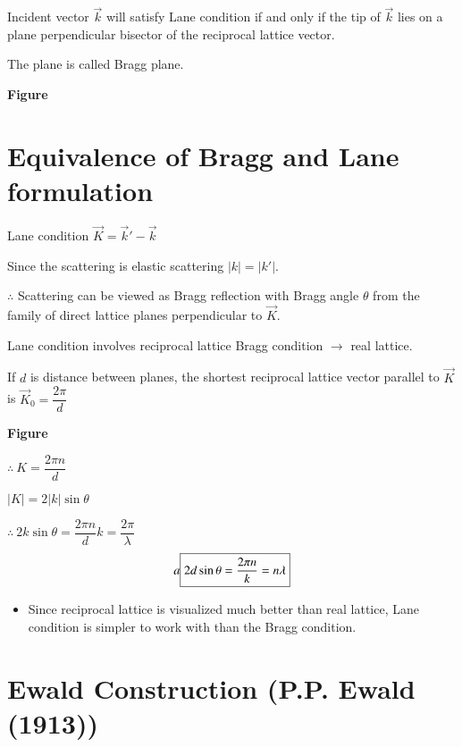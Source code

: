 Incident vector $\overrightarrow{k}$ will satisfy Lane condition if and only if the tip of $\overrightarrow{k}$ lies on a plane perpendicular bisector of the reciprocal lattice vector.

The plane is called Bragg plane.
\begin{center}
{\bf Figure}
\end{center}

\section*{Equivalence of Bragg and Lane formulation}

Lane condition $\overrightarrow{K}=\overrightarrow{k}'-\overrightarrow{k}$

Since the scattering is elastic scattering $|k|=|k'|$.

$\therefore$ Scattering can be viewed as Bragg reflection with Bragg angle $\theta$ from the family of direct lattice planes perpendicular to $\overrightarrow{K}$.

Lane condition involves reciprocal lattice Bragg condition $\to$ real lattice.

If $d$ is distance between planes, the shortest reciprocal lattice vector parallel to $\overrightarrow{K}$ is $\overrightarrow{K}_{0}=\dfrac{2\pi}{d}$
\begin{center}
{\bf Figure}
\end{center}

$\therefore \ K=\dfrac{2\pi n}{d}$

$|K|=2|k|\sin \theta$

$\therefore \ 2k\sin \theta=\dfrac{2\pi n}{d}$\quad $k=\dfrac{2\pi}{\lambda}$
$$
a\fbox{$2d\sin\theta=\dfrac{2\pi n}{k}=n\lambda$}
$$
\begin{itemize}
\item Since reciprocal lattice is visualized much better than real lattice, Lane condition is simpler to work with than the Bragg condition.
\end{itemize}

\section*{Ewald Construction (P.P. Ewald (1913))}

